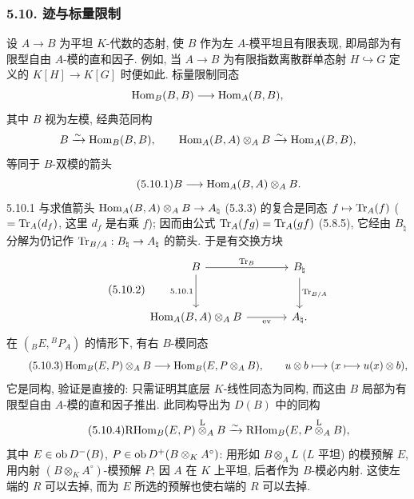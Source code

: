 \subsubsection*{5.10. 迹与标量限制}

设 $A\to B$ 为平坦 $K$-代数的态射, 使 $B$ 作为左 $A$-模平坦且有限表现, 即局部为有限型自由 $A$-模的直和因子. 例如, 当 $A\to B$ 为有限指数离散群单态射 $H\hookrightarrow G$ 定义的 $K[H]\to K[G]$ 时便如此. 标量限制同态
\[
\operatorname{Hom}_B(B,B)\longrightarrow\operatorname{Hom}_A(B,B),
\]
其中 $B$ 视为左模, 经典范同构
\[
B\xrightarrow{\sim}\operatorname{Hom}_B(B,B),\qquad \operatorname{Hom}_A(B,A)\otimes_AB\xrightarrow{\sim}\operatorname{Hom}_A(B,B),
\]
等同于 $B$-双模的箭头
\begin{equation}\tag{5.10.1}
B\longrightarrow\operatorname{Hom}_A(B,A)\otimes_AB.
\end{equation}
5.10.1 与求值箭头 $\operatorname{Hom}_A(B,A)\otimes_AB\to A_\natural$ (5.3.3) 的复合是同态 $f\mapsto\operatorname{Tr}_A(f)$ ($=\operatorname{Tr}_A(d_f)$, 这里 $d_f$ 是右乘 $f$); 因而由公式 $\operatorname{Tr}_A(fg)=\operatorname{Tr}_A(gf)$ (5.8.5), 它经由 $B_\natural$ 分解为仍记作 $\operatorname{Tr}_{B/A}:B_\natural\to A_\natural$ 的箭头. 于是有交换方块
\begin{equation}\tag{5.10.2}
\begin{tikzcd}[column sep=large,row sep=large]
B \arrow[r,"\Tr_B"] \arrow[d,"5.10.1"'] & B_\natural \arrow[d,"\Tr_{B/A}"]\\
\Hom_A(B,A)\otimes_AB \arrow[r,"\mathrm{ev}"'] & A_\natural .
\end{tikzcd}
\end{equation}
在 $({}_BE,{}^BP_A)$ 的情形下, 有右 $B$-模同态
\begin{equation}\tag{5.10.3}
\operatorname{Hom}_B(E,P)\otimes_AB\longrightarrow\operatorname{Hom}_B(E,P\otimes_AB),\qquad
u\otimes b\longmapsto(x\longmapsto u(x)\otimes b),
\end{equation}
它是同构, 验证是直接的: 只需证明其底层 $K$-线性同态为同构, 而这由 $B$ 局部为有限型自由 $A$-模的直和因子推出. 此同构导出为 $D(B)$ 中的同构
\begin{equation}\tag{5.10.4}
\mathrm{RHom}_B(E,P)\overset{\mathrm L}{\otimes}_AB\xrightarrow{\sim}\mathrm{RHom}_B(E,P\overset{\mathrm L}{\otimes}_AB),
\end{equation}
其中 $E\in\operatorname{ob} D^-(B)$, $P\in\operatorname{ob} D^+(B\otimes_KA^\circ)$: 用形如 $B\otimes_AL$ ($L$ 平坦) 的模预解 $E$, 用内射 $(B\otimes_KA^\circ)$-模预解 $P$; 因 $A$ 在 $K$ 上平坦, 后者作为 $B$-模必内射. 这使左端的 $R$ 可以去掉, 而为 $E$ 所选的预解也使右端的 $R$ 可以去掉.

